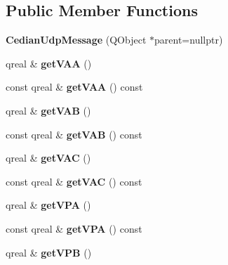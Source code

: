 \subsection*{Public Member Functions}
\begin{DoxyCompactItemize}
\item 
\mbox{\label{class_cedian_udp_message_a0bac5c391d604b1b59cf117ac2197392}} 
{\bfseries Cedian\+Udp\+Message} (Q\+Object $\ast$parent=nullptr)
\item 
\mbox{\label{class_cedian_udp_message_a935f3636971ff7671530042149791cf4}} 
qreal \& {\bfseries get\+V\+AA} ()
\item 
\mbox{\label{class_cedian_udp_message_a7f79a5922a61ca2345546ba20ad026be}} 
const qreal \& {\bfseries get\+V\+AA} () const
\item 
\mbox{\label{class_cedian_udp_message_ad79926ff6465c64ac636be5af7ed535d}} 
qreal \& {\bfseries get\+V\+AB} ()
\item 
\mbox{\label{class_cedian_udp_message_af79034f25718ae2a3f88567b711d7b26}} 
const qreal \& {\bfseries get\+V\+AB} () const
\item 
\mbox{\label{class_cedian_udp_message_a0f72fa16b246aa264d0afa054eb99efc}} 
qreal \& {\bfseries get\+V\+AC} ()
\item 
\mbox{\label{class_cedian_udp_message_ac7751d02c4cbaca7c183ac61aa1b67cf}} 
const qreal \& {\bfseries get\+V\+AC} () const
\item 
\mbox{\label{class_cedian_udp_message_a5d2f5380343f17391c48685e5ce37ff8}} 
qreal \& {\bfseries get\+V\+PA} ()
\item 
\mbox{\label{class_cedian_udp_message_aef92ac90d9bd9cbd98f8f3f3c41dae16}} 
const qreal \& {\bfseries get\+V\+PA} () const
\item 
\mbox{\label{class_cedian_udp_message_a2f352d561928f5f1b45c2bce933a9907}} 
qreal \& {\bfseries get\+V\+PB} ()

\end{DoxyCompactItemize}

